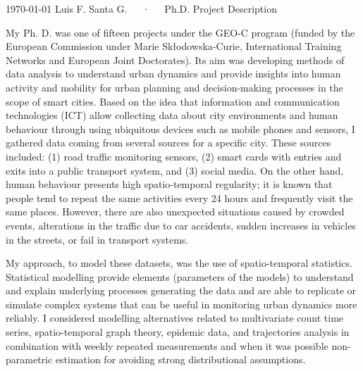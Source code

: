 \documentclass[11pt, a4paper]{awesome-cv}
\begin{document}
\makecvheader[R]

\makecvfooter
  {\today}
    {Luis F. Santa G.~~~·~~~Ph.D. Project Description}
  {}

\makelettertitle

\begin{cvletter}

My Ph. D. was one of fifteen projects under the GEO-C program (funded by the European Commission under Marie Skłodowska-Curie, International Training Networks and European Joint Doctorates). Its aim was developing methods of data analysis to understand urban dynamics and provide insights into human activity and mobility for urban planning and decision-making processes in the scope of smart cities. Based on the idea that information and communication technologies (ICT) allow collecting data about city environments and human behaviour through using ubiquitous devices such as mobile phones and sensors, I gathered data coming from several sources for a specific city. These sources included: (1) road traffic monitoring sensors, (2) smart cards with entries and exits into a public transport system, and (3) social media. On the other hand, human behaviour presents high spatio-temporal regularity; it is known that people tend to repeat the same activities every 24 hours and frequently visit the same places. However, there are also unexpected situations caused by crowded events, alterations in the traffic due to car accidents, sudden increases in vehicles in the streets, or fail in transport systems.\par
My approach, to model these datasets, was the use of spatio-temporal statistics. Statistical modelling provide elements (parameters of the models) to understand and explain underlying processes generating the data and are able to replicate or simulate complex systems that can be useful in monitoring urban dynamics more reliably. I considered modelling alternatives related to multivariate count time series, spatio-temporal graph theory, epidemic data, and trajectories analysis in combination with weekly repeated measurements and when it was possible non-parametric estimation for avoiding strong distributional assumptions.\par

\end{cvletter}
\end{document}
